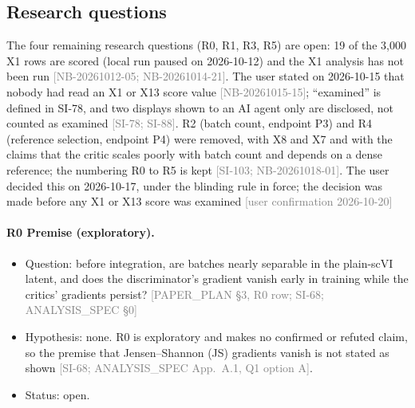 \documentclass[11pt]{article}
\newcommand{\src}[1]{{\scriptsize\textcolor{gray}{[#1]}}}
\begin{document}
\subsection{Research questions}
The four remaining research questions (R0, R1, R3, R5) are open: 19 of the 3,000 X1 rows are scored (local run paused on 2026-10-12) and the X1 analysis has not been run \src{NB-20261012-05; NB-20261014-21}. The user stated on 2026-10-15 that nobody had read an X1 or X13 score value \src{NB-20261015-15}; ``examined'' is defined in SI-78, and two displays shown to an AI agent only are disclosed, not counted as examined \src{SI-78; SI-88}.
R2 (batch count, endpoint P3) and R4 (reference selection, endpoint P4) were removed, with X8 and X7 and with the claims that the critic scales poorly with batch count and depends on a dense reference; the numbering R0 to R5 is kept \src{SI-103; NB-20261018-01}. The user decided this on 2026-10-17, under the blinding rule in force; the decision was made before any X1 or X13 score was examined \src{user confirmation 2026-10-20}

\paragraph{R0 Premise (exploratory).}
\begin{itemize}
\item Question: before integration, are batches nearly separable in the plain-scVI latent, and does the discriminator's gradient vanish early in training while the critics' gradients persist? \src{PAPER\_PLAN \S3, R0 row; SI-68; ANALYSIS\_SPEC \S0}
\item Hypothesis: none. R0 is exploratory and makes no confirmed or refuted claim, so the premise that Jensen--Shannon (JS) gradients vanish is not stated as shown \src{SI-68; ANALYSIS\_SPEC App.~A.1, Q1 option A}.
\item Status: open.
\end{itemize}
\end{document}
